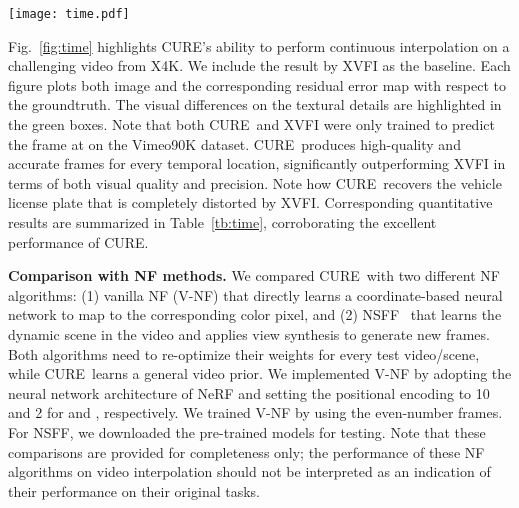 \documentclass[12pt]{article}
\def\proposed{CURE}
\begin{document}
\begin{figure*}[t!]
  \centering
  \texttt{[image: time.pdf]}
  \caption{Visual demonstration of the continuous interpolation by \proposed~on an example from the X4K dataset. Only two frames  are used for predicting several middle frames at temporal locations . Note the sharp textural details preserved by \proposed, but lost in the results by XVFI.}
  \label{fig:time}
\end{figure*}

Fig.~\ref{fig:time} highlights \proposed's ability to perform continuous interpolation on a challenging video from X4K. We include the result by XVFI as the baseline. Each figure plots both image and the corresponding residual error map with respect to the groundtruth. The visual differences on the textural details are highlighted in the green boxes. Note that both \proposed~and XVFI were only trained to predict the frame at  on the Vimeo90K dataset.
\proposed~produces high-quality and accurate frames for every temporal location, significantly outperforming XVFI in terms of both visual quality and precision. Note how \proposed~recovers the vehicle license plate that is completely distorted by XVFI. Corresponding quantitative results are summarized in Table~\ref{tb:time}, corroborating the excellent performance of \proposed.

\textbf{Comparison with NF methods.}
We compared \proposed\ with two different NF algorithms: (1) vanilla NF (V-NF) that directly learns a coordinate-based neural network to map  to the corresponding color pixel, and (2) NSFF~\cite{li2021neural} that learns the dynamic scene in the video and applies view synthesis to generate new frames. Both algorithms need to re-optimize their weights for every test video/scene, while \proposed~learns a general video prior. We implemented V-NF by adopting the neural network architecture of NeRF and setting the positional encoding  to 10 and 2 for  and , respectively. We trained V-NF by using the even-number frames. For NSFF, we downloaded the pre-trained models for testing. Note that these comparisons are provided for completeness only; the performance of these NF algorithms on video interpolation should not be interpreted as an indication of their performance on their original tasks. 
\end{document}

